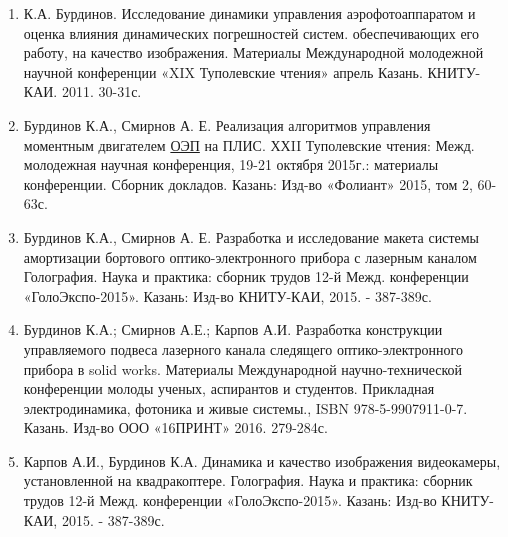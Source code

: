 \begin{enumerate}
  \item К.А. Бурдинов. Исследование динамики управления аэрофотоаппаратом и оценка влияния динамических погрешностей систем. обеспечивающих его работу, на качество изображения. Материалы Международной молодежной научной конференции «XIX Туполевские чтения» апрель Казань. КНИТУ- КАИ. 2011. 30-31с.
  \item Бурдинов К.А., Смирнов А. Е. Реализация алгоритмов управления моментным двигателем  \hyperref[acroEOS]{ОЭП} на ПЛИС. ХХII Туполевские чтения: Межд. молодежная научная конференция, 19-21 октября 2015г.: материалы конференции. Сборник докладов. Казань: Изд-во «Фолиант» 2015, том 2, 60-63с.
  \item Бурдинов К.А., Смирнов А. Е. Разработка и исследование макета системы амортизации бортового оптико-электронного прибора с лазерным каналом Голография. Наука и практика: сборник трудов 12-й Межд. конференции «ГолоЭкспо-2015». Казань: Изд-во КНИТУ-КАИ, 2015. - 387-389с.
  \item Бурдинов К.А.; Смирнов А.Е.; Карпов А.И. Разработка конструкции управляемого подвеса лазерного канала следящего оптико-электронного прибора в solid works. Материалы Международной научно-технической конференции молоды ученых, аспирантов и студентов. Прикладная электродинамика, фотоника и живые системы., ISBN 978-5-9907911-0-7. Казань. Изд-во ООО «16ПРИНТ» 2016. 279-284с.
  \item Карпов А.И., Бурдинов К.А. Динамика и качество изображения видеокамеры, установленной на квадракоптере. Голография. Наука и практика: сборник трудов 12-й Межд. конференции «ГолоЭкспо-2015». Казань: Изд-во КНИТУ-КАИ, 2015. - 387-389с.
 
\end{enumerate}
